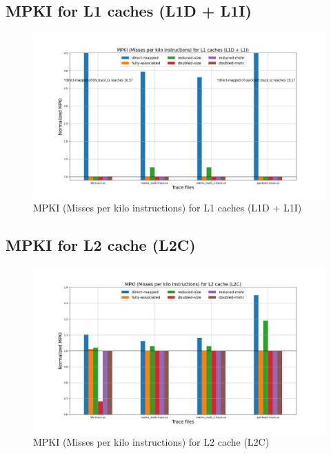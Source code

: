 \documentclass[11pt, swedish, openany]{book}
\begin{document}
\subsection{MPKI for L1 caches (L1D + L1I)}
\begin{figure}[H]
    \centering
    \includegraphics[scale=0.4]{champsim/mpki_l1.png}
    \caption{MPKI (Misses per kilo instructions) for L1 caches (L1D + L1I)}
\end{figure}

\subsection{MPKI for L2 cache (L2C)}
\begin{figure}[H]
    \centering
    \includegraphics[scale=0.4]{champsim/mpki_l2.png}
    \caption{MPKI (Misses per kilo instructions) for L2 cache (L2C)}
\end{figure}
\end{document}
